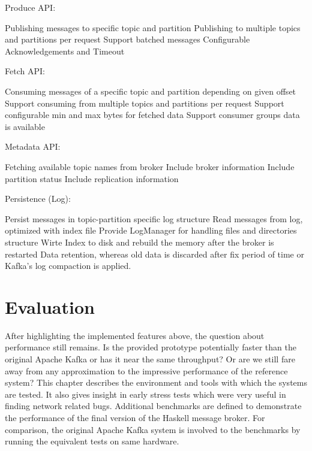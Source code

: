 Produce API:
\begin{itemize}
        \tick Publishing messages to specific topic and partition
        \tick Publishing to multiple topics and partitions per request
        \tick Support batched messages
        \fail Configurable Acknowledgements and Timeout
\end{itemize}

Fetch API:
\begin{itemize}
        \tick Consuming messages of a specific topic and partition depending on given offset
        \fail Support consuming from multiple topics and partitions per request
        \fail Support configurable min and max bytes for fetched data
        \fail Support consumer groups
        data is available
\end{itemize}

Metadata API:
\begin{itemize}
        \tick Fetching available topic names from broker
        \tick Include broker information
        \fail Include partition status
        \fail Include replication information
\end{itemize}

Persistence (Log):
\begin{itemize}
        \tick Persist messages in topic-partition specific log structure
        \tick Read messages from log, optimized with index file
        \tick Provide LogManager for handling files and directories structure
        \fail Wirte Index to disk and rebuild the memory after the broker is restarted
        \fail Data retention, whereas old data is discarded after fix period of
            time or Kafka's log compaction is applied. 
\end{itemize}

\newpage
\section{Evaluation}

After highlighting the implemented features above, the question about
performance still remains. Is the provided prototype potentially faster than the
original Apache Kafka or has it near the same throughput? Or are we still fare
away from any approximation to the impressive performance of the reference
system? This chapter describes the environment and tools with which the systems
are tested.  It also gives insight in early stress tests which were very useful
in finding network related bugs. Additional benchmarks are defined to
demonstrate the performance of the final version of the Haskell message broker.
For comparison, the original Apache Kafka system is involved to the benchmarks
by running the equivalent tests on same hardware.


